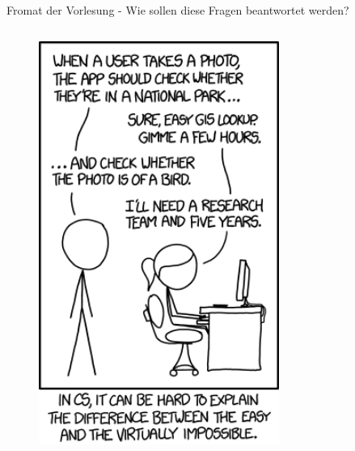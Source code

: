 \documentclass[aspectratio=1610, xcolor=dvipsnames, 9pt]{beamer}
\begin{document}
\begin{frame}{Fromat der Vorlesung - Wie sollen diese Fragen beantwortet werden?}
\begin{columns}
\begin{column}{0.3\textwidth}
\begin{figure}
             \includegraphics[width=0.7\textwidth]{images/tasks.png} 
 \end{figure}
    \end{column}
  \end{columns}
\end{frame}
\end{document}
